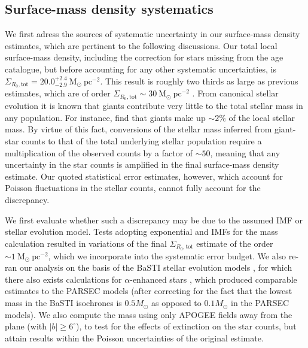  \subsection{Surface-mass density systematics}
\label{sec:discrepant}
We first adress the sources of systematic uncertainty in our surface-mass density estimates, which are pertinent to the following discussions. Our total local surface-mass density, including the correction for stars missing from the age catalogue, but before accounting for any other systematic uncertainties, is $\Sigma_{R_0, \text{tot}} = 20.0_{-2.9}^{+2.4}\ \mathrm{M_{\odot} \ pc^{-2}}$. This result is roughly two thirds as large as previous estimates, which are of order $\Sigma_{R_0, \text{tot}} \sim 30\ \mathrm{M_{\odot} \ pc^{-2}}$ \citep[e.g.][]{2006MNRAS.372.1149F,2012ApJ...751..131B,2015ApJ...814...13M}. From canonical stellar evolution it is known that giants contribute very little to the total stellar mass in any population. For instance, \citet{2015ApJ...814...13M} find that giants make up $\sim 2\%$ of the local stellar mass. By virtue of this fact, conversions of the stellar mass inferred from giant-star counts to that of the total underlying stellar population require a multiplication of the observed counts by a factor of $\sim 50$, meaning that any uncertainty in the star counts is amplified in the final surface-mass density estimate. Our quoted statistical error estimates, however, which account for Poisson fluctuations in the stellar counts, cannot fully account for the discrepancy. 

We first evaluate whether such a discrepancy may be due to the assumed IMF or stellar evolution model. Tests adopting exponential 
\citet{2003PASP..115..763C} and \citet{2001MNRAS.322..231K} IMFs for the mass calculation resulted in variations of the final $\Sigma_{R_0, \text{tot}}$ estimate of the order $\sim 1\ \mathrm{M_{\odot}\ pc^{-2}}$, which we incorporate into the systematic error budget. We also re-ran our analysis on the basis of the BaSTI stellar evolution models \citep{2004ApJ...612..168P}, for which there also exists calculations for $\alpha$-enhanced stars \citep{2006ApJ...642..797P}, which produced comparable estimates to the PARSEC models (after correcting for the fact that the lowest mass in the BaSTI isochrones is $0.5 M_{\odot}$ as opposed to $0.1 M_{\odot}$ in the PARSEC models). We also compute the mass using only APOGEE fields away from the plane (with $|b|\geq 6^{\circ}$), to test for the effects of extinction on the star counts, but attain results within the Poisson uncertainties of the original estimate.

